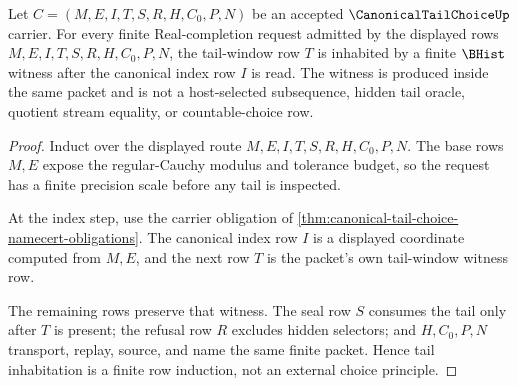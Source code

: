 \begin{theorem}
\label{thm:canonical-tail-choice-tail-inhabitation}
Let $C=(M,E,I,T,S,R,H,C_0,P,N)$ be an accepted $\CanonicalTailChoiceUp$ carrier. For every finite Real-completion request admitted by the displayed rows $M,E,I,T,S,R,H,C_0,P,N$, the tail-window row $T$ is inhabited by a finite $\BHist$ witness after the canonical index row $I$ is read. The witness is produced inside the same packet and is not a host-selected subsequence, hidden tail oracle, quotient stream equality, or countable-choice row.
\end{theorem}
\begin{proof}
Induct over the displayed route $M,E,I,T,S,R,H,C_0,P,N$. The base rows $M,E$ expose the regular-Cauchy modulus and tolerance budget, so the request has a finite precision scale before any tail is inspected.

At the index step, use the carrier obligation of \autoref{thm:canonical-tail-choice-namecert-obligations}. The canonical index row $I$ is a displayed coordinate computed from $M,E$, and the next row $T$ is the packet's own tail-window witness row.

The remaining rows preserve that witness. The seal row $S$ consumes the tail only after $T$ is present; the refusal row $R$ excludes hidden selectors; and $H,C_0,P,N$ transport, replay, source, and name the same finite packet. Hence tail inhabitation is a finite row induction, not an external choice principle.
\end{proof}

